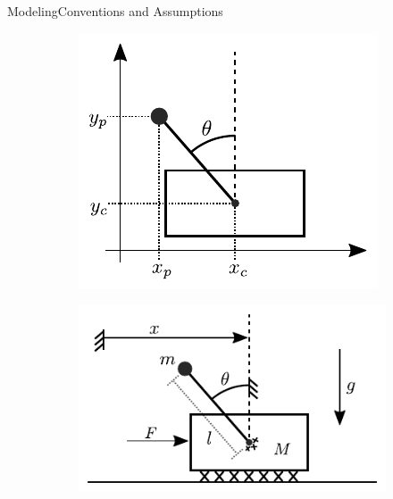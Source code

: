 \begin{frame}{Modeling}{Conventions and Assumptions}
  \small
  \vspace{-1cm}
  \begin{figure}[H]
    \begin{minipage}{0.45\linewidth}
      \begin{figure}[H]
        \hspace{-3cm}
        \includegraphics[width=1\linewidth]{figures/excessiveCoordinates}
      \end{figure}        
    \end{minipage}\hspace{-1cm}
    \begin{minipage}{0.45\linewidth}
      \begin{figure}[H]
        \vspace{.2cm}
        \includegraphics[width=1.3\linewidth]{figures/mechanicalDrawing}

\end{figure}
\end{minipage}
\end{figure}
\end{frame}
